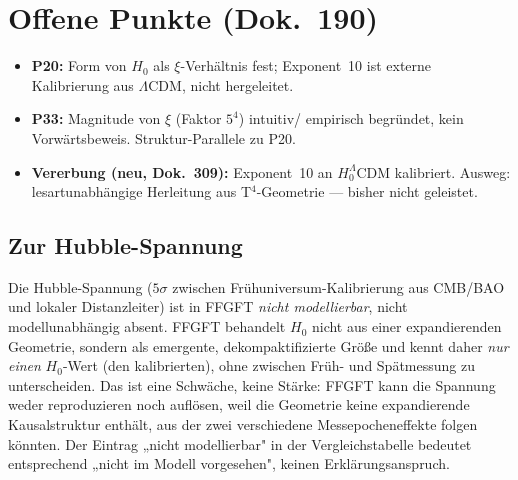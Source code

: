 \chapter{Offene Punkte (Dok.~190)}

\begin{itemize}
  \item \textbf{P20:} Form von $H_0$ als $\xi$-Verhältnis fest;
        Exponent~10 ist externe Kalibrierung aus $\Lambda$CDM,
        nicht hergeleitet.
  \item \textbf{P33:} Magnitude von $\xi$ (Faktor $5^4$) intuitiv/
        empirisch begründet, kein Vorwärtsbeweis. Struktur-Parallele
        zu P20.
  \item \textbf{Vererbung (neu, Dok.~309):} Exponent~10 an
        $H_0^\Lambda$CDM kalibriert. Ausweg: lesartunabhängige
        Herleitung aus T$^4$-Geometrie — bisher nicht geleistet.
\end{itemize}


\section*{Zur Hubble-Spannung}

Die Hubble-Spannung ($5\sigma$ zwischen Frühuniversum-Kalibrierung
aus CMB/BAO und lokaler Distanzleiter) ist in FFGFT \emph{nicht modellierbar},
nicht modellunabhängig absent. FFGFT behandelt $H_0$ nicht aus einer
expandierenden Geometrie, sondern als emergente, dekompaktifizierte Größe
und kennt daher \emph{nur einen} $H_0$-Wert (den kalibrierten), ohne
zwischen Früh- und Spätmessung zu unterscheiden. Das ist eine Schwäche,
keine Stärke: FFGFT kann die Spannung weder reproduzieren noch auflösen,
weil die Geometrie keine expandierende Kausalstruktur enthält, aus der
zwei verschiedene Messepocheneffekte folgen könnten. Der Eintrag
„nicht modellierbar" in der Vergleichstabelle bedeutet entsprechend
„nicht im Modell vorgesehen", keinen Erklärungsanspruch.
